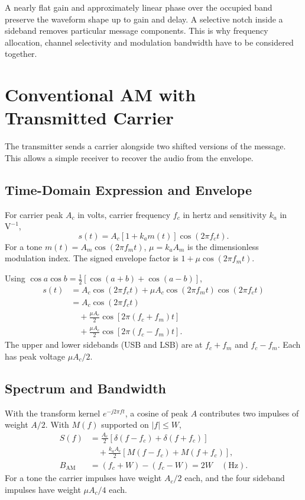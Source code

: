 \documentclass[12pt,a4paper]{article}
\begin{document}
A nearly flat gain and approximately linear phase over the occupied band preserve the waveform shape up to gain and delay. A selective notch inside a sideband removes particular message components. This is why frequency allocation, channel selectivity and modulation bandwidth have to be considered together.

\section{Conventional AM with Transmitted Carrier}
The transmitter sends a carrier alongside two shifted versions of the message. This allows a simple receiver to recover the audio from the envelope.

\subsection{Time-Domain Expression and Envelope}

\begin{tcolorbox}[defbox, title={Double Sideband with Transmitted Carrier (DSB-TC)}]
For carrier peak $A_c$ in volts, carrier frequency $f_c$ in hertz and sensitivity $k_a$ in $\mathrm{V^{-1}}$,
\[
s(t)=A_c[1+k_a m(t)]\cos(2\pi f_ct).
\]
For a tone $m(t)=A_m\cos(2\pi f_mt)$, $\mu=k_aA_m$ is the dimensionless modulation index. The signed envelope factor is $1+\mu\cos(2\pi f_mt)$.
\end{tcolorbox}

Using $\cos a\cos b=\tfrac12[\cos(a+b)+\cos(a-b)]$,
\[
\begin{aligned}
 s(t)&=A_c\cos(2\pi f_ct)+\mu A_c\cos(2\pi f_mt)\cos(2\pi f_ct)\\
     &=A_c\cos(2\pi f_ct)\\
     &\quad+\frac{\mu A_c}{2}\cos[2\pi(f_c+f_m)t]\\
     &\quad+\frac{\mu A_c}{2}\cos[2\pi(f_c-f_m)t].
\end{aligned}
\]
The upper and lower sidebands (USB and LSB) are at $f_c+f_m$ and $f_c-f_m$. Each has peak voltage $\mu A_c/2$.

\subsection{Spectrum and Bandwidth}
With the transform kernel $e^{-j2\pi ft}$, a cosine of peak $A$ contributes two impulses of weight $A/2$. With $M(f)$ supported on $|f|\le W$,
\[
\begin{aligned}
 S(f)&=\frac{A_c}{2}[\delta(f-f_c)+\delta(f+f_c)]\\
     &\quad+\frac{k_a A_c}{2}[M(f-f_c)+M(f+f_c)],\\
 B_{\mathrm{AM}}&=(f_c+W)-(f_c-W)=2W\quad(\mathrm{Hz}).
\end{aligned}
\]
For a tone the carrier impulses have weight $A_c/2$ each, and the four sideband impulses have weight $\mu A_c/4$ each.
\end{document}
